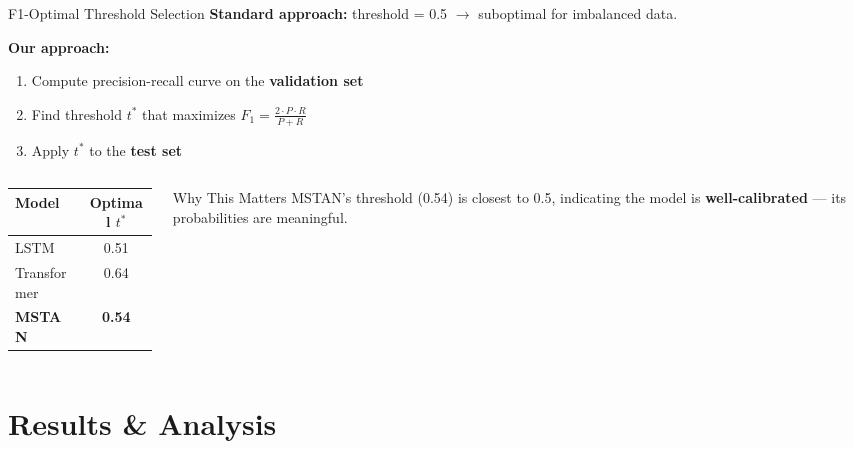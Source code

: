 \documentclass[aspectratio=169,11pt]{beamer}
\begin{document}
\begin{frame}{F1-Optimal Threshold Selection}
\textbf{Standard approach:} threshold = 0.5 $\rightarrow$ suboptimal for imbalanced data.
\vspace{6pt}

\textbf{Our approach:}
\begin{enumerate}
    \item Compute precision-recall curve on the \textbf{validation set}
    \item Find threshold $t^*$ that maximizes $F_1 = \frac{2 \cdot P \cdot R}{P + R}$
    \item Apply $t^*$ to the \textbf{test set}
\end{enumerate}
\vspace{6pt}
\begin{columns}[T]
\begin{column}{0.48\textwidth}
\centering
\begin{tabular}{lc}
\toprule
\textbf{Model} & \textbf{Optimal $t^*$} \\
\midrule
LSTM & 0.51 \\
Transformer & 0.64 \\
\textbf{MSTAN} & \textbf{0.54} \\
\bottomrule
\end{tabular}
\end{column}
\begin{column}{0.48\textwidth}
\begin{exampleblock}{Why This Matters}
MSTAN's threshold (0.54) is closest to 0.5, indicating the model is \textbf{well-calibrated} — its probabilities are meaningful.
\end{exampleblock}
\end{column}
\end{columns}
\end{frame}

\section{Results \& Analysis}
\end{document}

